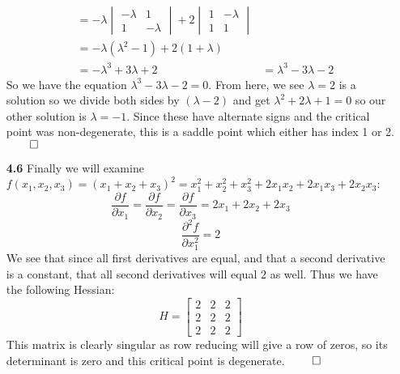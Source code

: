\documentclass[12pt]{report}
\begin{document}
\begin{enumerate}
\begin{align*}
&= -\lambda\begin{vmatrix} -\lambda & 1 \\ 1 & -\lambda \end{vmatrix} + 2\begin{vmatrix} 1 & -\lambda \\ 1 & 1 \end{vmatrix} \\
&= -\lambda(\lambda^2-1) + 2(1+\lambda) \\
&= -\lambda^3+3\lambda +2
&= \lambda^3-3\lambda -2
\end{align*}
So we have the equation $\lambda^3-3\lambda -2=0$. From here, we see $\lambda=2$ is a solution so we divide both sides by $(\lambda-2)$ and get $\lambda^2+2\lambda+1=0$ so our other solution is $\lambda=-1$. Since these have alternate signs and the critical point was non-degenerate, this is a saddle point which either has index 1 or 2. $\qed$

\item[\bf 4.6] Finally we will examine $f(x_1,x_2,x_3)=(x_1+x_2+x_3)^2 = x_1^2 + x_2^2 + x_3^2 + 2x_1x_2 + 2x_1x_3 + 2x_2x_3$:
$$\frac{\partial f}{\partial x_1} = \frac{\partial f}{\partial x_2} = \frac{\partial f}{\partial x_3} = 2x_1 + 2x_2 + 2x_3$$
$$\frac{\partial^2 f}{\partial x_1^2} = 2$$
We see that since all first derivatives are equal, and that a second derivative is a constant, that all second derivatives will equal $2$ as well. Thus we have the following Hessian:
$$H=\begin{bmatrix}
2 & 2 & 2 \\
2 & 2 & 2 \\
2 & 2 & 2
\end{bmatrix}$$
This matrix is clearly singular as row reducing will give a row of zeros, so its determinant is zero and this critical point is degenerate. $\qed$


\end{enumerate}
\end{document}
